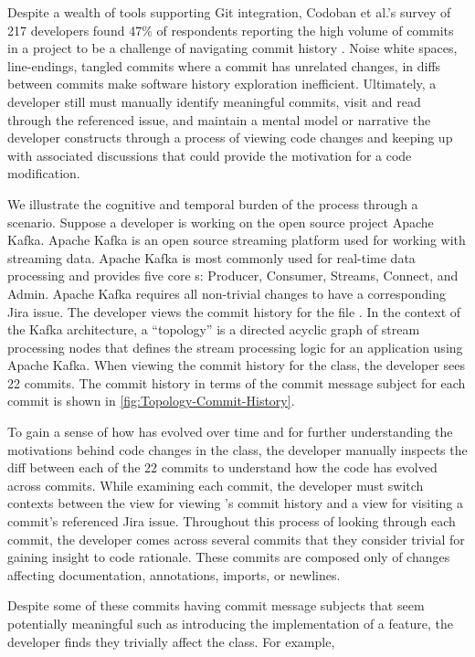 Despite a wealth of tools supporting Git integration, Codoban et al.'s survey of 217 developers found 47\% of respondents reporting the high volume of commits in a project to be a challenge of navigating commit history \cite{codoban_software_2015}. 
Noise \eg white spaces, line-endings, tangled commits where a commit has unrelated changes, \etc in diffs between commits make software history exploration inefficient. 
Ultimately, a developer still must manually identify meaningful commits, visit and read through the referenced issue, and maintain a mental model or narrative the developer constructs through a process of viewing code changes and keeping up with associated discussions that could provide the motivation for a code modification. 

We illustrate the cognitive and temporal burden of the process through a scenario.
Suppose a developer is working on the open source project Apache Kafka. 
Apache Kafka is an open source streaming platform used for working with streaming data. Apache Kafka is most commonly used for real-time data processing and provides five core s: Producer, Consumer, Streams, Connect, and Admin.
Apache Kafka requires all non-trivial changes to have a corresponding Jira issue. 
The developer views the commit history for the file .
In the context of the Kafka architecture, a ``topology'' is a directed acyclic graph of stream processing nodes that defines the stream processing logic for an application using Apache Kafka.
When viewing the commit history for the  class, the developer sees 22 commits.
The commit history in terms of the commit message subject for each commit is shown in \autoref{fig:Topology-Commit-History}.

To gain a sense of how  has evolved over time and for further understanding the motivations behind code changes in the class, the developer manually inspects the diff between each of the 22 commits to understand how the code has evolved across commits.
While examining each commit, the developer must switch contexts between the view for viewing 's commit history and a view for visiting a commit's referenced Jira issue.
Throughout this process of looking through each commit, the developer comes across several commits that they consider trivial for gaining insight to code rationale. 
These commits are composed only of changes affecting documentation, annotations, imports, or newlines. 

Despite some of these commits having commit message subjects that seem potentially meaningful such as introducing the implementation of a feature, the developer finds they trivially affect the  class. 
For example, 

